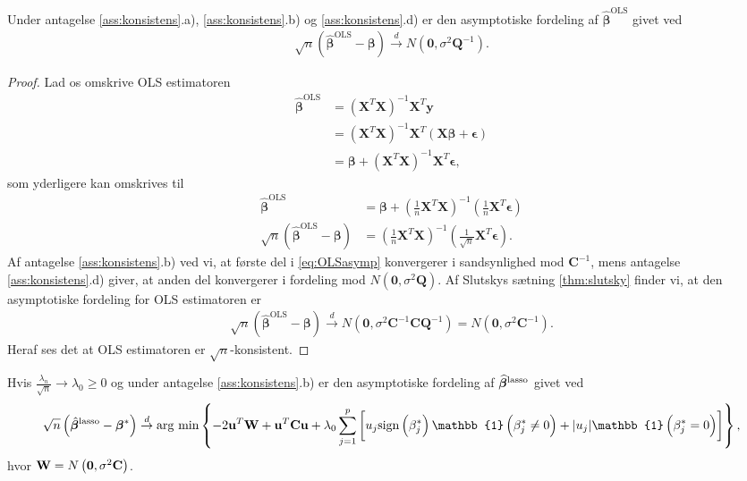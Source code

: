 \begin{thm}
Under antagelse \ref{ass:konsistens}.a), \ref{ass:konsistens}.b) og \ref{ass:konsistens}.d) er den asymptotiske fordeling af $\boldsymbol{\hat{\beta}}^{\text{OLS}}$ givet ved
\begin{align*}
\sqrt{n}(\hat{\boldsymbol{\beta}}^{\text{OLS}}-\boldsymbol{\beta}) \overset{d}{\rightarrow} N(\mathbf{0},\sigma^2 \mathbf{Q}^{-1}).
\end{align*}
\end{thm}
\begin{proof}
Lad os omskrive OLS estimatoren
\begin{align*}
\hat{\boldsymbol{\beta}}^{\text{OLS}}  &= (\textbf{X}^T\textbf{X})^{-1}\textbf{X}^T\textbf{y} \\
&= (\textbf{X}^T\textbf{X})^{-1}\textbf{X}^T (\textbf{X} \boldsymbol{\beta} + \boldsymbol{\epsilon}) \\
&= \boldsymbol{\beta} + (\textbf{X}^T\textbf{X})^{-1}\textbf{X}^T \boldsymbol{\epsilon},
\end{align*}
som yderligere kan omskrives til
\begin{align}
\hat{\boldsymbol{\beta}}^{\text{OLS}}  &=\boldsymbol{\beta} + \left( \frac{1}{n} \mathbf{X}^T \mathbf{X} \right)^{-1} \left( \frac{1}{n} \mathbf{X}^T \boldsymbol{\epsilon} \right) \nonumber \\
\sqrt{n}(\hat{\boldsymbol{\beta}}^{\text{OLS}} -\boldsymbol{\beta})&=\left( \frac{1}{n} \mathbf{X}^T \mathbf{X} \right)^{-1} \left( \frac{1}{\sqrt{n}} \mathbf{X}^T \boldsymbol{\epsilon} \right). \label{eq:OLSasymp}
\end{align}
Af antagelse \ref{ass:konsistens}.b) ved vi, at første del i \eqref{eq:OLSasymp} konvergerer i sandsynlighed mod $\mathbf{C}^{-1}$, mens antagelse \ref{ass:konsistens}.d) giver, at anden del konvergerer i fordeling mod $N(\mathbf{0},\sigma^2 \mathbf{Q})$. Af Slutskys sætning \ref{thm:slutsky} finder vi, at den asymptotiske fordeling for OLS estimatoren er
\begin{align*}
\sqrt{n}(\hat{\boldsymbol{\beta}}^{\text{OLS}}-\boldsymbol{\beta}) \overset{d}{\rightarrow} N(\mathbf{0},\sigma^2 \mathbf{C}^{-1} \mathbf{C} \mathbf{Q}^{-1})=N(\mathbf{0},\sigma^2 \mathbf{C}^{-1}).
\end{align*}
Heraf ses det at OLS estimatoren er \(\sqrt{n}\)-konsistent.
\end{proof}
%
\begin{thm}
Hvis $\frac{\lambda_n}{\sqrt{n}} \rightarrow \lambda_0 \geq 0$ og under antagelse \ref{ass:konsistens}.b) er den asymptotiske fordeling af \(\widehat{\boldsymbol{\beta}}^\text{lasso}\) givet ved
\begin{align*}
\sqrt{n} \del{\hat{\tbeta}^\text{lasso} - \tbeta^*} \overset{d}{\rightarrow} \argmin \cbr{ -2 \mathbf{u}^T \mathbf{W} + \mathbf{u}^T \mathbf{C} \mathbf{u} + \lambda_0 \sum_{j=1}^p \sbr{u_j \text{sign} \del{\beta^*_j} \mathbb{1} \del{\beta_j^* \neq 0} + \vert u_j \vert \mathbb{1} \del{\beta_j^* = 0}}},
\end{align*}
hvor \(\mathbf{W} = N\del{\mathbf{0}, \sigma^2 \mathbf{C}}\).
\end{thm}
